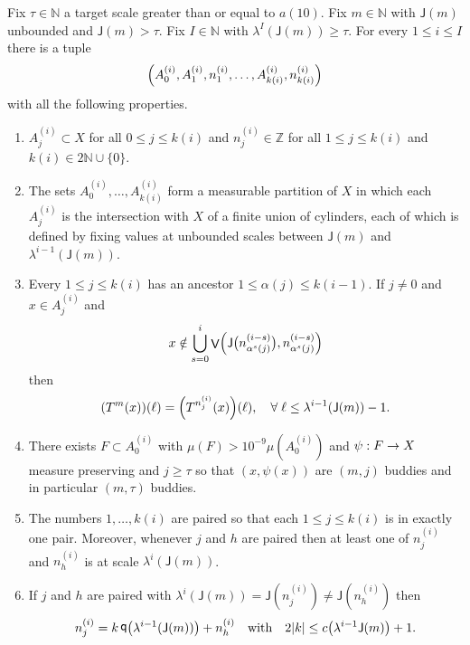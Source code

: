 \documentclass[AHL,Unicode,longabstracts,published]{cedram}
\DeclareMathOperator{\bad}{\mathsf{V}}
\DeclareMathOperator{\q}{\mathsf{q}}
\newcommand{\N}{\mathbb{N}}
\newcommand{\Z}{\mathbb{Z}}
\newcommand{\scl}{\mathsf{J}}
\let\originalleft\left
\let\originalright\right
\renewcommand{\left}{\mathopen{}\mathclose\bgroup\originalleft}
\renewcommand{\right}{\aftergroup\egroup\originalright}
\renewcommand*{\to}{\mathchoice{\longrightarrow}{\rightarrow}{\rightarrow}{\rightarrow}}
\newcommand*{\relabel}{\renewcommand{\labelenumi}{(\theenumi)}}
\newcommand*{\Eenumi}{\renewcommand*{\theenumi}{E\arabic{enumi}}\relabel}
\let\oldforall\forall
\renewcommand*{\forall}{\mathrel{\oldforall}}
\begin{document}
\begin{prop}\label{prop:reduction}
Fix $\tau \in \N$ a target scale greater than or equal to $a(10)$. Fix $m \in \N$ with $\scl(m)$ unbounded and $\scl(m) > \tau$. Fix $I \in \N$ with $\lambda^I(\scl(m)) \ge \tau$. For every $1 \le i \le I$ there is a tuple
\begin{equation}\label{eq:tuple}
\left(A_0^{(i)}, A_1^{(i)},n_1^{(i)}, \dots, A_{k(i)}^{(i)},n^{(i)}_{k(i)} \right)
\end{equation}
with all the following properties.
\begin{enumerate}\Eenumi
\item\label{cond:setup}
$A_j^{(i)} \subset X$ for all $0 \le j \le k(i)$ and $n^{(i)}_j \in \Z$ for all $1 \le j \le k(i)$ and $k(i) \in 2\N \cup \{0\}$.
\item\label{cond:partition}
The sets $A^{(i)}_0,\dots,A^{(i)}_{k(i)}$ form a measurable partition of $X$ in which each $A^{(i)}_j$ is the intersection with $X$ of a finite union of cylinders, each of which is defined by fixing values at unbounded scales between $\scl(m)$ and $\lambda^{i-1}(\scl(m))$.
\item\label{cond:agree}
Every $1 \le j \le k(i)$ has an ancestor $1 \le \alpha(j) \le k(i-1)$. If $j \ne 0$ and $x \in A_j^{(i)}$ and
\begin{equation}\label{eqn:bad ancestors}
x \notin \bigcup_{s=0}^i \bad \left(\scl \bigl(n^{(i-s)}_{\alpha^s(j)} \bigr), n^{(i-s)}_{\alpha^s(j)} \right)
\end{equation}
then
\begin{equation}\label{eq:same coords}
(T^m(x))(\ell) = \left(T^{n_j^{(i)}}(x)\right)(\ell),\quad \forall\ell\leq \lambda^{i-1}(\scl(m))-1.
\end{equation}
\item\label{cond:Azero friends}
There exists $F\subset A^{(i)}_0$ with $\mu(F)>10^{-9}\mu(A^{(i)}_0) $ and $\psi:F \to X$ measure preserving and $j \ge \tau$ so that $(x,\psi(x))$ are $(m,j)$ buddies and in particular $(m,\tau)$ buddies.
\item\label{cond:differ}
The numbers $1,\dots,k(i)$ are paired so that each $1 \le j \le k(i)$ is in exactly one pair. Moreover, whenever $j$ and $h$ are paired then at least one of $n_j^{(i)}$ and $n_h^{(i)}$ is at scale $\lambda^i(\scl(m))$.
\item\label{cond:paired numbers}
If $j$ and $h$ are paired with $\lambda^i(\scl(m)) = \scl(n_j^{(i)}) \ne \scl(n_h^{(i)})$ then
\[
n_j^{(i)}=k\q\left(\lambda^{i-1}(\scl(m))\right)+n_h^{(i)}\quad\text{with}\quad 2|k| \le c\left(\lambda^{i-1}\scl(m)\right) + 1.
\]
\end{enumerate}
\end{prop}
\end{document}
